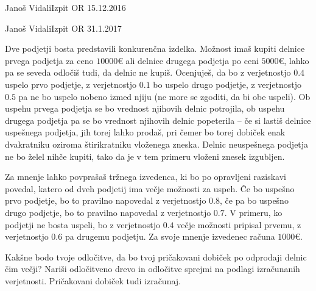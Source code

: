 \begin{naloga}{Janoš Vidali}{Izpit OR 15.12.2016}
\begin{vprasanje}[avtobus]
\begin{slika}
\end{slika}
\end{vprasanje}
\begin{odgovor}
\end{odgovor}
\end{naloga}


\begin{naloga}{Janoš Vidali}{Izpit OR 31.1.2017}
\begin{vprasanje}
Dve podjetji bosta predstavili konkurenčna izdelka.
Možnost imaš kupiti delnice prvega podjetja za ceno $10000 €$
ali delnice drugega podjetja po ceni $5000 €$,
lahko pa se seveda odločiš tudi, da delnic ne kupiš.
Ocenjuješ, da bo z verjetnostjo $0.4$ uspelo prvo podjetje,
z verjetnostjo $0.1$ bo uspelo drugo podjetje,
z verjetnostjo $0.5$ pa ne bo uspelo nobeno izmed njiju
(ne more se zgoditi, da bi obe uspeli).
Ob uspehu prvega podjetja se bo vrednost njihovih delnic potrojila,
ob uspehu drugega podjetja pa se bo vrednost njihovih delnic popeterila
-- če si lastiš delnice uspešnega podjetja, jih torej lahko prodaš,
pri čemer bo torej dobiček enak
dvakratniku oziroma štirikratniku vloženega zneska.
Delnic neuspešnega podjetja ne bo želel nihče kupiti,
tako da je v tem primeru vloženi znesek izgubljen.

Za mnenje lahko povprašaš tržnega izvedenca,
ki bo po opravljeni raziskavi povedal,
katero od dveh podjetij ima večje možnosti za uspeh.
Če bo uspešno prvo podjetje, bo to pravilno napovedal z verjetnostjo $0.8$,
če pa bo uspešno drugo podjetje,
bo to pravilno napovedal z verjetnostjo $0.7$.
V primeru, ko podjetji ne bosta uspeli,
bo z verjetnostjo $0.4$ večje možnosti pripisal prvemu,
z verjetnostjo $0.6$ pa drugemu podjetju.
Za svoje mnenje izvedenec računa $1000 €$.

Kakšne bodo tvoje odločitve,
da bo tvoj pričakovani dobiček po odprodaji delnic čim večji?
Nariši od\-lo\-čit\-ve\-no drevo
in odločitve sprejmi na podlagi izračunanih verjetnosti.
Pričakovani dobiček tudi izračunaj.
\end{vprasanje}
\begin{odgovor}
\end{odgovor}
\end{naloga}


